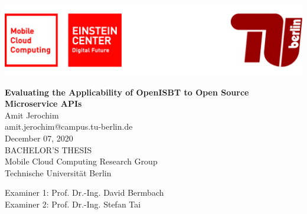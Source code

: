 
\thispagestyle{empty}

\includegraphics[width=\linewidth]{fig/Logo_Header}
\mbox{}\\[1pc]
\begin{center}
\huge{ \bfseries Evaluating the Applicability of OpenISBT to Open Source Microservice APIs}\\[2pc]

\Large{Amit Jerochim}\\
\large{amit.jerochim@campus.tu-berlin.de}\\[1pc]
\large{December 07, 2020}\\[2pc]

BACHELOR'S THESIS\\
Mobile Cloud Computing Research Group\\
Technische Universität Berlin
\end{center}
\vfill

Examiner 1: Prof. Dr.-Ing. David Bermbach
\hfill{}\\
Examiner 2: Prof. Dr.-Ing. Stefan Tai

\afterpage{\null\thispagestyle{empty}\newpage}
